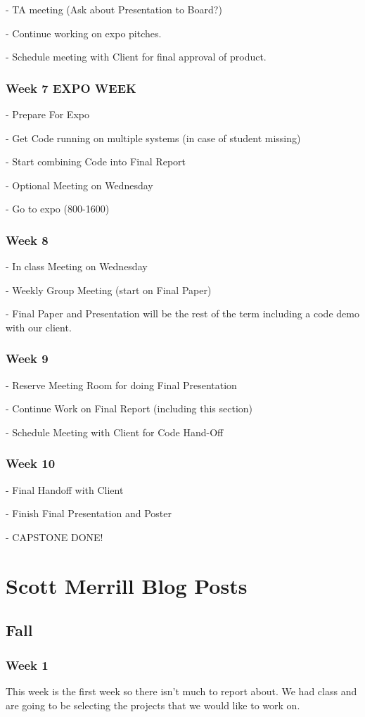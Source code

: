 - TA meeting (Ask about Presentation to Board?)

- Continue working on expo pitches.

- Schedule meeting with Client for final approval of product.

\subsubsection{Week 7 EXPO WEEK}
- Prepare For Expo

- Get Code running on multiple systems (in case of student missing)

- Start combining Code into Final Report

- Optional Meeting on Wednesday

- Go to expo (800-1600)
\subsubsection{Week 8}
- In class Meeting on Wednesday

- Weekly Group Meeting (start on Final Paper)

- Final Paper and Presentation will be the rest of the term including a code demo with our client.

\subsubsection{Week 9}
- Reserve Meeting Room for doing Final Presentation

- Continue Work on Final Report (including this section)

- Schedule Meeting with Client for Code Hand-Off

\subsubsection{Week 10}
- Final Handoff with Client

- Finish Final Presentation and Poster

- CAPSTONE DONE!

\section{ Scott Merrill Blog Posts }
\subsection{Fall}
\subsubsection{Week 1}
This week is the first week so there isn't much to report about. We had class and are going to be selecting the projects that we would like to work on.
